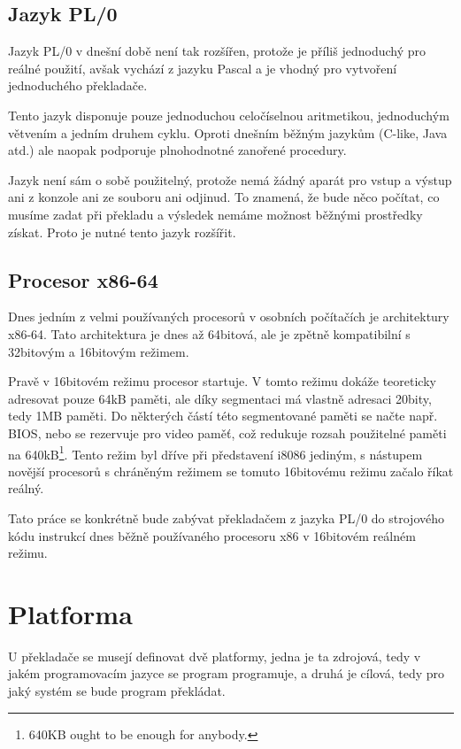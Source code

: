 \documentclass[a4paper]{article}
\begin{document}
\subsection{Jazyk PL/0}
Jazyk PL/0 v dne\v{s}n\'i dob\v{e} nen\'i tak roz\v{s}\'i\v{r}en, proto\v{z}e
je p\v{r}\'ili\v{s} jednoduch\'y pro re\'aln\'e pou\v{z}it\'i, av\v{s}ak
vych\'az\'i z jazyku Pascal a je vhodn\'y
pro vytvo\v{r}en\'i jednoduch\'eho p\v{r}eklada\v{c}e.

Tento jazyk disponuje pouze jednoduchou celo\v{c}\'iselnou
aritmetikou, jednoduch\'ym v\v{e}tven\'im a jedn\'im druhem cyklu.
Oproti dne\v{s}n\'im b\v{e}\v{z}n\'ym jazyk\r{u}m (C-like, Java atd.)
ale naopak podporuje plnohodnotn\'e zano\v{r}en\'e procedury.

Jazyk nen\'i s\'am o sob\v{e} pou\v{z}iteln\'y, proto\v{z}e nem\'a
\v{z}\'adn\'y apar\'at pro vstup a v\'ystup ani z konzole ani
ze souboru ani odjinud. To znamen\'a, \v{z}e bude n\v{e}co
po\v{c}\'itat, co mus\'ime zadat p\v{r}i p\v{r}ekladu a v\'ysledek
nem\'ame mo\v{z}nost b\v{e}\v{z}n\'ymi prost\v{r}edky z\'iskat. Proto
je nutn\'e tento jazyk roz\v{s}\'i\v{r}it.
\subsection{Procesor x86-64}
Dnes jedn\'im z velmi pou\v{z}\'ivan\'ych procesor\r{u} v osobn\'ich
po\v{c}\'ita\v{c}\'ich je architektury x86-64. Tato architektura je dnes
a\v{z} 64bitov\'a, ale je zp\v{e}tn\v{e} kompatibiln\'i s 32bitov\'ym
a 16bitov\'ym re\v{z}imem.

Prav\v{e} v 16bitov\'em re\v{z}imu procesor startuje. V tomto re\v{z}imu
dok\'a\v{z}e teoreticky adresovat pouze 64kB pam\v{e}ti, ale d\'iky
segmentaci m\'a vlastn\v{e} adresaci 20bity, tedy 1MB pam\v{e}ti. Do
n\v{e}kter\'ych \v{c}\'ast\'i t\'eto segmentovan\'e pam\v{e}ti se na\v{c}te
nap\v{r}. BIOS, nebo se rezervuje pro video pam\v{e}\v{t}, co\v{z} redukuje
rozsah pou\v{z}iteln\'e pam\v{e}ti na 640kB\footnote{640KB
ought to be enough for anybody.}. Tento re\v{z}im byl d\v{r}\'ive
p\v{r}i p\v{r}edstaven\'i i8086 jedin\'ym, s n\'astupem nov\v{e}j\v{s}\'i
procesor\r{u} s chr\'an\v{e}n\'ym re\v{z}imem se tomuto 16bitov\'emu
re\v{z}imu za\v{c}alo \v{r}\'ikat re\'aln\'y.

Tato pr\'ace se konkr\'etn\v{e} bude zab\'yvat p\v{r}eklada\v{c}em z
jazyka PL/0 do strojov\'eho k\'odu instrukc\'i dnes b\v{e}\v{z}n\v{e}
pou\v{z}\'ivan\'eho procesoru x86 v 16bitov\'em re\'al\-n\'em re\v{z}imu.
\clearpage
\section{Platforma}
U p\v{r}eklada\v{c}e se musej\'i definovat dv\v{e} platformy, jedna je ta
zdrojov\'a, tedy v jak\'em programovac\'im jazyce se program programuje,
a druh\'a je c\'ilov\'a, tedy pro jak\'y syst\'em se bude program
p\v{r}ekl\'adat.
\end{document}
